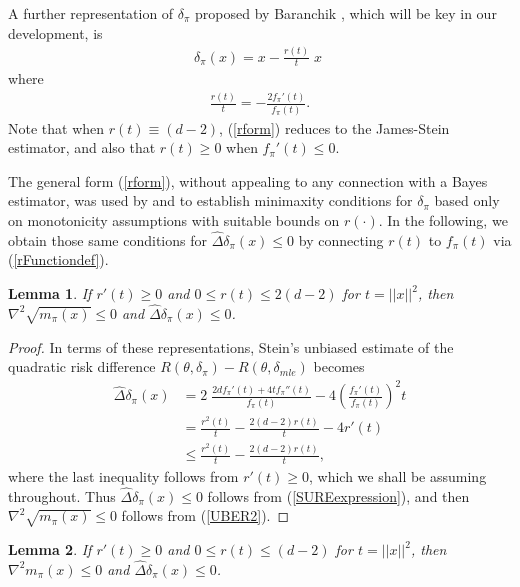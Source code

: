 \documentclass[11pt]{article}
\newtheorem{lemma}{Lemma}
\theoremstyle{definition}
\begin{document}
A further representation of $\delta_{\pi}$ proposed by Baranchik \cite{Baranchik1970}, which will be key in our development, is
\begin{align}
   \delta_{\pi}(x) = x - \frac{r(t)}{t}\;x\; 
   \label{rform}
\end{align}
where
\begin{align}
    \frac{r(t)}{t} = - \frac{2f_{\pi}'(t)}{f_{\pi}(t)}.
    \label{rFunctiondef}
\end{align}
Note that when $r(t) \equiv (d-2)$,  (\ref{rform}) reduces to the James-Stein estimator, and also that $r(t) \geq 0$ when $f_{\pi}'(t) \leq 0.$

The general form (\ref{rform}), without appealing to any connection with a Bayes estimator, was used by \cite{Baranchik1970} and \cite{s1971} to establish minimaxity conditions for $\delta_{\pi}$ based only on monotonicity assumptions with suitable bounds on $r(\cdot)$.  In the following, we obtain those same conditions for $\hat{\Delta}\delta_\pi(x) \leq 0$  by connecting $r(t)$ to $f_{\pi}(t)$ via (\ref{rFunctiondef}).

  \begin{lemma}  \label{Lemma2.1}
 If $r'(t) \ge 0$ and $0 \le r(t) \leq 2(d-2)$ for $t = ||x||^2$, then $\nabla^2 \sqrt{m_{\pi}(x)} \leq 0$ and $\hat{\Delta}\delta_\pi(x) \leq 0$.
  \end{lemma}

  \begin{proof} 
In terms of these representations, Stein's unbiased estimate of the quadratic risk difference $R(\theta,\delta_\pi) - R(\theta, \delta_{mle})$ becomes
 \begin{align}
    \nonumber  \hat{\Delta}\delta_\pi(x) & = 2\;\frac{2 d f_{\pi}'(t) + 4 t f_{\pi}''(t)}{f_{\pi}(t)} - 4\left(\frac{f_{\pi}'(t)}{f_{\pi}(t)}\right)^2t \\
     \nonumber & = \frac{r^2(t)}{t} - \frac{2(d-2)r(t)}{t} - 4r'(t) \\
& \leq \frac{r^2(t)}{t} - \frac{2(d-2)r(t)}{t},
     \label{SUREexpression}
 \end{align}
where the last inequality follows from $r'(t) \geq 0$, which we shall be assuming throughout. Thus $\hat{\Delta}\delta_\pi(x) \leq 0$ follows from  (\ref{SUREexpression}), and then $\nabla^2 \sqrt{m_{\pi}(x)} \leq 0$ follows from (\ref{UBER2}).
 \end{proof}

 \begin{lemma}  \label{Lemma2.2}
If $r'(t) \ge 0$ and $0 \le r(t) \leq (d-2)$ for $t = ||x||^2$, then $\nabla^2  m_{\pi}(x) \leq 0$ and $\hat{\Delta}\delta_\pi(x) \leq 0$.
 \end{lemma}
 
\end{document}
